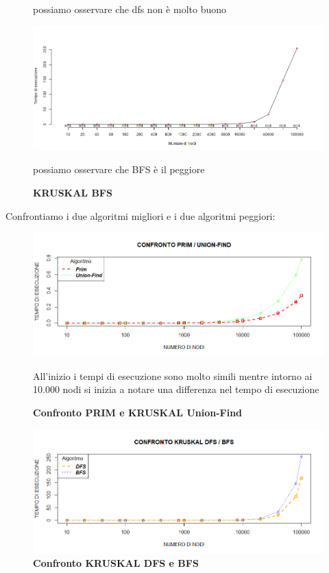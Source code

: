 \documentclass[]{article}
\begin{document}
\begin{flushleft}
\begin{figure}[h]
possiamo osservare che dfs non è molto buono
\end{figure}

\begin{figure}[h]

\includegraphics[width=\textwidth,height=\textheight,keepaspectratio]{K_BFS_MEDIA.png}
\caption{\textbf{KRUSKAL BFS}}

possiamo osservare che BFS è il peggiore
\end{figure}

Confrontiamo i due algoritmi migliori e i due algoritmi peggiori:

\begin{figure}[h]

\includegraphics[width=\textwidth,height=\textheight,keepaspectratio]{COMPARE_1.png}
\caption{\textbf{Confronto PRIM e KRUSKAL Union-Find}}

All'inizio i tempi di esecuzione sono molto simili mentre intorno ai 10.000 nodi si inizia a notare una differenza nel tempo di esecuzione
\end{figure}

\begin{figure}[h]

\includegraphics[width=\textwidth,height=\textheight,keepaspectratio]{COMPARE_2.png}
\caption{\textbf{Confronto KRUSKAL DFS e BFS}}


\end{figure}
\end{flushleft}
\end{document}
